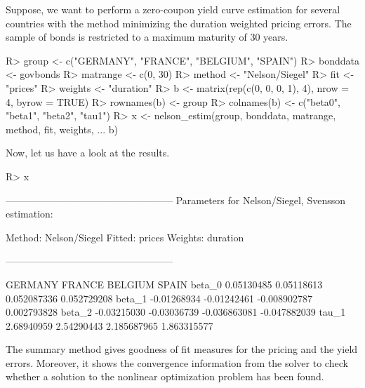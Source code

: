 Suppose, we want to perform a zero-coupon yield curve estimation for several countries with the \cite{Nelson1987} method minimizing the duration weighted pricing errors. The sample of bonds is restricted to a maximum maturity of 30 years. 

\begin{Schunk}
\begin{Sinput}
R> group <- c("GERMANY", "FRANCE", "BELGIUM", "SPAIN")
R> bonddata <- govbonds
R> matrange <- c(0, 30)
R> method <- "Nelson/Siegel"
R> fit <- "prices"
R> weights <- "duration"
R> b <- matrix(rep(c(0, 0, 0, 1), 4), nrow = 4, byrow = TRUE)
R> rownames(b) <- group
R> colnames(b) <- c("beta0", "beta1", "beta2", "tau1")
R> x <- nelson_estim(group, bonddata, matrange, method, fit, weights, 
...    b)
\end{Sinput}
\end{Schunk}

Now, let us have a look at the results.

\begin{Schunk}
\begin{Sinput}
R> x
\end{Sinput}
\begin{Soutput}
---------------------------------------------------
Parameters for Nelson/Siegel, Svensson estimation:

Method: Nelson/Siegel 
Fitted: prices 
Weights: duration 

---------------------------------------------------

           GERMANY      FRANCE      BELGIUM        SPAIN
beta_0  0.05130485  0.05118613  0.052087336  0.052729208
beta_1 -0.01268934 -0.01242461 -0.008902787  0.002793828
beta_2 -0.03215030 -0.03036739 -0.036863081 -0.047882039
tau_1   2.68940959  2.54290443  2.185687965  1.863315577
\end{Soutput}
\end{Schunk}

The summary method gives goodness of fit measures for the pricing and the yield errors. Moreover, it shows the convergence information from the solver to check whether a solution to the nonlinear optimization problem has been found.

